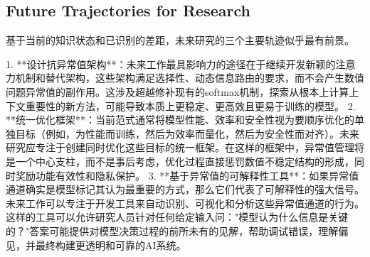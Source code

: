 \documentclass{article}
\begin{document}
\subsection{Future Trajectories for Research}

基于当前的知识状态和已识别的差距，未来研究的三个主要轨迹似乎最有前景。

1. **设计抗异常值架构**：未来工作最具影响力的途径在于继续开发新颖的注意力机制和替代架构，这些架构满足选择性、动态信息路由的要求，而不会产生数值问题异常值的副作用。这涉及超越修补现有的softmax机制，探索从根本上计算上下文重要性的新方法，可能导致本质上更稳定、更高效且更易于训练的模型。
2. **统一优化框架**：当前范式通常将模型性能、效率和安全性视为要顺序优化的单独目标（例如，为性能而训练，然后为效率而量化，然后为安全性而对齐）。未来研究应专注于创建同时优化这些目标的统一框架。在这样的框架中，异常值管理将是一个中心支柱，而不是事后考虑，优化过程直接惩罚数值不稳定结构的形成，同时奖励功能有效性和隐私保护。
3. **基于异常值的可解释性工具**：如果异常值通道确实是模型标记其认为最重要的方式，那么它们代表了可解释性的强大信号。未来工作可以专注于开发工具来自动识别、可视化和分析这些异常值通道的行为。这样的工具可以允许研究人员针对任何给定输入问："模型认为什么信息是关键的？"答案可能提供对模型决策过程的前所未有的见解，帮助调试错误，理解偏见，并最终构建更透明和可靠的AI系统。



\end{document}
